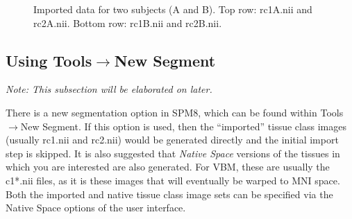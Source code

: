 \begin{figure}
\begin{center}
\end{center}
\caption{
Imported data for two subjects (A and B).
Top row: rc1A.nii and rc2A.nii.
Bottom row: rc1B.nii and rc2B.nii.
\label{Fig:imported}}
\end{figure}

\subsection{Using Tools$\rightarrow$New Segment}
\emph{Note: This subsection will be elaborated on later.}

There is a new segmentation option in SPM8, which can be found within Tools$\rightarrow$New Segment.  If this option is used, then the ``imported'' tissue class images (usually rc1.nii and rc2.nii) would be generated directly and the initial import step is skipped.
It is also suggested that \emph{Native Space} versions of the tissues in which you are interested are also generated. For VBM, these  are usually the c1*.nii files, as it is these images that will eventually be warped to MNI space.
Both the imported and native tissue class image sets can be specified via the Native Space options of the user interface.
 
